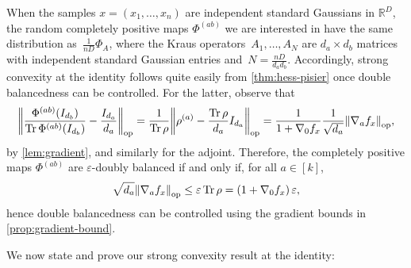\documentclass[aos]{imsart}
\theoremstyle{definition}
\numberwithin{equation}{section}
\DeclareMathOperator{\op}{op}
\DeclareMathOperator{\tr}{Tr}
\DeclarePairedDelimiter{\norm}{\lVert}{\rVert}
\newcommand{\R}{{\mathbb{R}}}
\newcommand{\eps}{\varepsilon}
\begin{document}
When the samples $x=(x_1,\dots,x_n)$ are independent standard Gaussians in $\R^D$,
the random completely positive maps $\Phi^{(ab)}$ we are interested in have the same distribution as~$\frac1{nD}\Phi_A$, where the Kraus operators~$A_1,\dots,A_N$ are $d_a \times d_b$ matrices with independent standard Gaussian entries and~$N=\frac{nD}{d_ad_b}$.
Accordingly, strong convexity at the identity follows quite easily from \cref{thm:hess-pisier} once double balancedness can be controlled.
For the latter, observe that
\begin{align*}
  \norm*{\frac{\Phi^{(ab)}(I_{d_b})}{\tr \Phi^{(ab)}(I_{d_b})} - \frac{I_{d_a}}{d_a}}_{\op}
= \frac1{\tr\rho} \norm*{\rho^{(a)} - \frac{\tr \rho}{d_a} I_{d_a}}_{\op}
= \frac1{1 + \nabla_0 f_x} \frac1{\sqrt{d_a}} \norm*{\nabla_a f_x}_{\op},
\end{align*}
by \cref{lem:gradient}, and similarly for the adjoint.
Therefore, the completely positive maps $\Phi^{(ab)}$ are $\eps$-doubly balanced if and only if, for all $a\in[k]$,
\begin{align}\label{eq:balanced via grad}
  \sqrt{d_a} \norm*{\nabla_a f_x}_{\op} \leq \eps \tr \rho = \left( 1 + \nabla_0 f_x \right) \eps,
\end{align}
hence double balancedness can be controlled using the gradient bounds in \cref{prop:gradient-bound}.

We now state and prove our strong convexity result at the identity:
\end{document}

